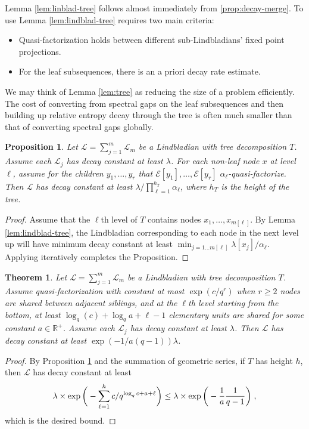 \documentclass[11pt,reqno]{amsart}
\newtheorem{prop}[lemma]{Proposition}
\newtheorem{theorem}[lemma]{Theorem}
\newcommand{\RR}{\mathbb{R}}
\newcommand{\E}{\mathcal{E}}
\newcommand{\pl}{\hspace{.1cm}}
\renewcommand{\L}{\mathcal{L}}
\begin{document}
Lemma \ref{lem:linblad-tree} follows almost immediately from \ref{prop:decay-merge}. To use Lemma \ref{lem:lindblad-tree} requires two main criteria:
\begin{itemize}
    \item Quasi-factorization holds between different sub-Lindbladians' fixed point projections.
    \item For the leaf subsequences, there is an a priori decay rate estimate.
\end{itemize}
We may think of Lemma \ref{lem:tree} as reducing the size of a problem efficiently. The cost of converting from spectral gaps on the leaf subsequences and then building up relative entropy decay through the tree is often much smaller than that of converting spectral gaps globally.
\begin{prop} \label{prop:tree-whole}
    Let $\L = \sum_{j=1}^m \L_m$ be a Lindbladian with tree decomposition $T$. Assume each $\L_j$ has decay constant at least $\lambda$.
    For each non-leaf node $x$ at level $\ell$, assume for the children $y_1, \dots, y_{r}$ that $\E[y_1], \dots, \E[y_r]$ $\alpha_\ell$-quasi-factorize. %
    Then $\L$ has decay constant at least $\lambda / \prod_{\ell=1}^{h_T} \alpha_{\ell}$, where $h_T$ is the height of the tree.
\end{prop}
\begin{proof}
    Assume that the $\ell$th level of $T$ contains nodes $x_1, \dots, x_{m[\ell]}$. By Lemma \ref{lem:lindblad-tree}, the Lindbladian corresponding to each node in the next level up will have minimum decay constant at least $\min_{j = 1 \dots m[\ell]} \lambda[x_j] / \alpha_\ell$. Applying iteratively completes the Proposition.
\end{proof}
\begin{theorem} \label{thm:regular-tree}
    Let $\L = \sum_{j=1}^m \L_m$ be a Lindbladian with tree decomposition $T$. Assume quasi-factorization with constant at most $\exp(c / q^r)$ when $r \geq 2$ nodes are shared between adjacent siblings, and at the $\ell$th level starting from the bottom, at least $\log_q (c) + \log_q a + \ell - 1$ elementary units are shared for some constant $a \in \RR^+$.
    Assume each $\L_j$ has decay constant at least $\lambda$. Then $\L$ has decay constant at least $\exp(- 1 / a(q-1)) \lambda$.
\end{theorem}
\begin{proof}
    By Proposition \ref{prop:tree-whole} and the summation of geometric series, if $T$ has height $h$, then $\L$ has decay constant at least
    \begin{equation}
        \lambda \times \exp \bigg ( - \sum_{\ell=1}^h c / q^{ \log_q c + a + \ell } \bigg )
            \leq \lambda \times \exp \bigg ( - \frac{1}{a} \frac{1}{q-1} \bigg ) \pl,
    \end{equation}
    which is the desired bound.
\end{proof}
\end{document}
